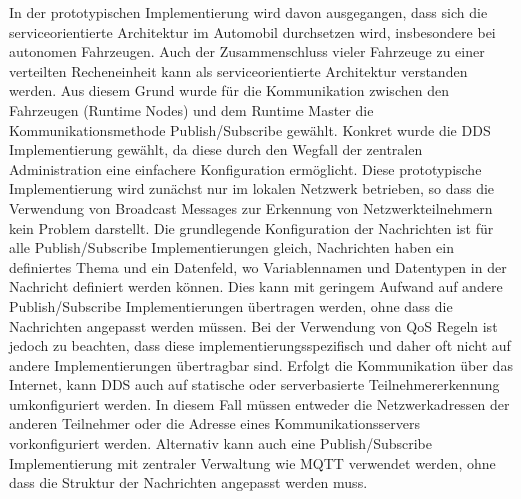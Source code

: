 In der prototypischen Implementierung wird davon ausgegangen, dass sich die serviceorientierte Architektur im Automobil durchsetzen wird, insbesondere bei autonomen Fahrzeugen. Auch der Zusammenschluss vieler Fahrzeuge zu einer verteilten Recheneinheit kann als serviceorientierte Architektur verstanden werden. Aus diesem Grund wurde für die Kommunikation zwischen den Fahrzeugen (Runtime Nodes) und dem Runtime Master die Kommunikationsmethode Publish/Subscribe gewählt. Konkret wurde die \gls{DDS} Implementierung gewählt, da diese durch den Wegfall der zentralen Administration eine einfachere Konfiguration ermöglicht. Diese prototypische Implementierung wird zunächst nur im lokalen Netzwerk betrieben, so dass die Verwendung von Broadcast Messages zur Erkennung von Netzwerkteilnehmern kein Problem darstellt. Die grundlegende Konfiguration der Nachrichten ist für alle Publish/Subscribe Implementierungen gleich, Nachrichten haben ein definiertes Thema und ein Datenfeld, wo Variablennamen und Datentypen in der Nachricht definiert werden können. Dies kann mit geringem Aufwand auf andere Publish/Subscribe Implementierungen übertragen werden, ohne dass die Nachrichten angepasst werden müssen. Bei der Verwendung von \gls{QoS} Regeln ist jedoch zu beachten, dass diese implementierungsspezifisch und daher oft nicht auf andere Implementierungen übertragbar sind. Erfolgt die Kommunikation über das Internet, kann \gls{DDS} auch auf statische oder serverbasierte Teilnehmererkennung umkonfiguriert werden. In diesem Fall müssen entweder die Netzwerkadressen der anderen Teilnehmer oder die Adresse eines Kommunikationsservers vorkonfiguriert werden. Alternativ kann auch eine Publish/Subscribe Implementierung mit zentraler Verwaltung wie \gls{MQTT} verwendet werden, ohne dass die Struktur der Nachrichten angepasst werden muss. 

